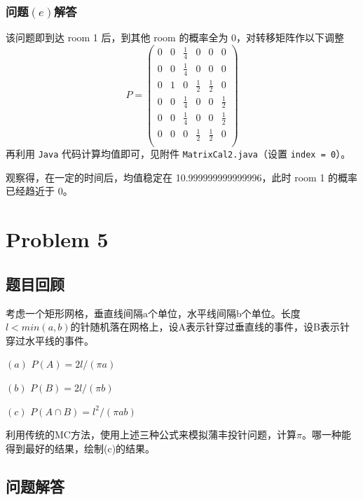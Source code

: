 \documentclass[12pt,a4paper]{article}%
\begin{document}
\subsubsection{问题$\left(e\right)$解答}
该问题即到达 room 1 后，到其他 room 的概率全为 0，对转移矩阵作以下调整
    \begin{equation*}
        P = \left( \begin{matrix*}
                       0 & 0 & \frac{1}{4} & 0           & 0           & 0 \\
                       0 & 0 & \frac{1}{4} & 0           & 0           & 0 \\
                       0 & 1 & 0           & \frac{1}{2} & \frac{1}{2} & 0 \\
                       0 & 0 & \frac{1}{4} & 0           & 0           & \frac{1}{2} \\
                       0 & 0 & \frac{1}{4} & 0           & 0           & \frac{1}{2} \\
                       0 & 0 & 0           & \frac{1}{2} & \frac{1}{2} & 0 \\
        \end{matrix*} \right)
    \end{equation*}
    再利用 \texttt{Java} 代码计算均值即可，见附件 \texttt{MatrixCal2.java}（设置 \texttt{index = 0}）。

    观察得，在一定的时间后，均值稳定在 10.999999999999996，此时 room 1 的概率已经趋近于 0。
    


\section{Problem 5}
\subsection{题目回顾}
考虑一个矩形网格，垂直线间隔a个单位，水平线间隔b个单位。长度$l<min(a,b)$的针随机落在网格上，设A表示针穿过垂直线的事件，设B表示针穿过水平线的事件。

$\left(a\right)$  $P(A)=2l/(\pi a)$

$\left(b\right)$  $P(B)=2l/(\pi b)$

$\left(c\right)$  $P(A\cap  B)=l^2/(\pi ab)$

利用传统的MC方法，使用上述三种公式来模拟蒲丰投针问题，计算$\pi$。哪一种能得到最好的结果，绘制(c)的结果。

\subsection{问题解答}
\end{document}
